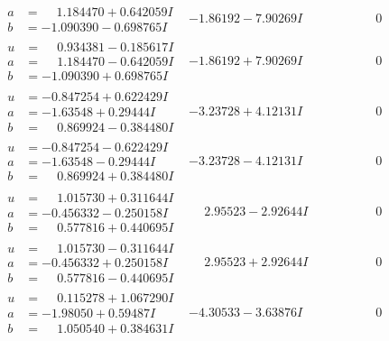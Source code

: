 \documentclass[1p]{elsarticle_modified}
\theoremstyle{definition}
\begin{document}
$$\begin{array}{c|c|c}
\begin{aligned}
a &= \phantom{-}1.184470 + 0.642059 I \\
b &= -1.090390 - 0.698765 I\end{aligned}
 & -1.86192 - 7.90269 I & \phantom{-0.000000 } 0 \\ \hline\begin{aligned}
u &= \phantom{-}0.934381 - 0.185617 I \\
a &= \phantom{-}1.184470 - 0.642059 I \\
b &= -1.090390 + 0.698765 I\end{aligned}
 & -1.86192 + 7.90269 I & \phantom{-0.000000 } 0 \\ \hline\begin{aligned}
u &= -0.847254 + 0.622429 I \\
a &= -1.63548 + 0.29444 I \\
b &= \phantom{-}0.869924 - 0.384480 I\end{aligned}
 & -3.23728 + 4.12131 I & \phantom{-0.000000 } 0 \\ \hline\begin{aligned}
u &= -0.847254 - 0.622429 I \\
a &= -1.63548 - 0.29444 I \\
b &= \phantom{-}0.869924 + 0.384480 I\end{aligned}
 & -3.23728 - 4.12131 I & \phantom{-0.000000 } 0 \\ \hline\begin{aligned}
u &= \phantom{-}1.015730 + 0.311644 I \\
a &= -0.456332 - 0.250158 I \\
b &= \phantom{-}0.577816 + 0.440695 I\end{aligned}
 & \phantom{-}2.95523 - 2.92644 I & \phantom{-0.000000 } 0 \\ \hline\begin{aligned}
u &= \phantom{-}1.015730 - 0.311644 I \\
a &= -0.456332 + 0.250158 I \\
b &= \phantom{-}0.577816 - 0.440695 I\end{aligned}
 & \phantom{-}2.95523 + 2.92644 I & \phantom{-0.000000 } 0 \\ \hline\begin{aligned}
u &= \phantom{-}0.115278 + 1.067290 I \\
a &= -1.98050 + 0.59487 I \\
b &= \phantom{-}1.050540 + 0.384631 I\end{aligned}
 & -4.30533 - 3.63876 I & \phantom{-0.000000 } 0 \\ \hline\begin{aligned}

\end{aligned}
\end{array}$$
\end{document}
